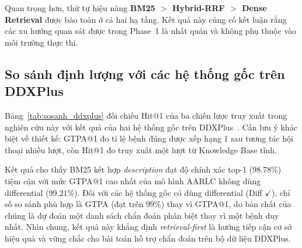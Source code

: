 Quan trọng hơn, thứ tự hiệu năng \textbf{BM25 $>$ Hybrid-RRF $>$ Dense Retrieval} được bảo toàn ở cả hai hạ tầng. Kết quả này củng cố kết luận rằng các xu hướng quan sát được trong Phase~1 là nhất quán và không phụ thuộc vào môi trường thực thi.

\subsection{So sánh định lượng với các hệ thống gốc trên DDXPlus}
\label{subsec:sosanh_baseline}

Bảng~\ref{tab:sosanh_ddxplus} đối chiếu Hit@1 của ba chiến lược truy xuất trong nghiên cứu này với kết quả của hai hệ thống gốc trên DDXPlus~\cite{ddxplus2022}. Cần lưu ý khác biệt về thiết kế: GTPA@1 đo tỉ lệ bệnh đúng được xếp hạng 1 sau tương tác hội thoại nhiều lượt, còn Hit@1 đo truy xuất một lượt từ Knowledge Base tĩnh.

Kết quả cho thấy BM25 kết hợp \textit{description} đạt độ chính xác top-1 ($98.78\%$) tiệm cận với mức GTPA@1 cao nhất của mô hình AARLC không dùng differential ($99.21\%$). Đối với các hệ thống gốc có dùng differential (Diff $\checkmark$), chỉ số so sánh phù hợp là GTPA (đạt trên $99\%$) thay vì GTPA@1, do bản chất của chúng là dự đoán một danh sách chẩn đoán phân biệt thay vì một bệnh duy nhất. Nhìn chung, kết quả này khẳng định \textit{retrieval-first} là hướng tiếp cận cơ sở hiệu quả và vững chắc cho bài toán hỗ trợ chẩn đoán trên bộ dữ liệu DDXPlus.

